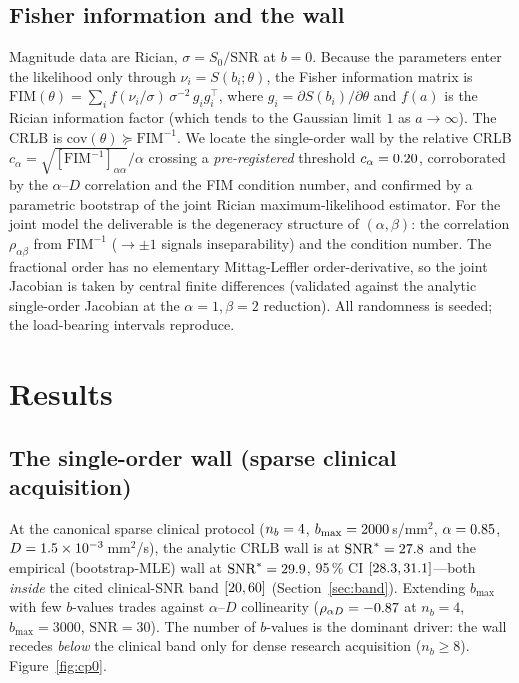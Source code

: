 \documentclass[11pt]{article}
\newcommand{\rhoab}{\rho_{\alpha\beta}}
\newcommand{\cva}{c_\alpha}
\begin{document}
\subsection{Fisher information and the wall}
Magnitude data are Rician, $\sigma=S_0/\mathrm{SNR}$ at $b=0$. Because the parameters enter the
likelihood only through $\nu_i=S(b_i;\theta)$, the Fisher information matrix is
$\mathrm{FIM}(\theta)=\sum_i f(\nu_i/\sigma)\,\sigma^{-2}\,g_i g_i^{\top}$, where
$g_i=\partial S(b_i)/\partial\theta$ and $f(a)$ is the Rician information factor (which tends to
the Gaussian limit $1$ as $a\to\infty$). The CRLB is $\mathrm{cov}(\theta)\succeq
\mathrm{FIM}^{-1}$. We locate the single-order wall by the relative CRLB
$\cva=\sqrt{[\mathrm{FIM}^{-1}]_{\alpha\alpha}}/\alpha$ crossing a \emph{pre-registered}
threshold $\cva=\numCVthr$, corroborated by the $\alpha$--$D$ correlation and the FIM condition
number, and confirmed by a parametric bootstrap of the joint Rician maximum-likelihood
estimator. For the joint model the deliverable is the degeneracy structure of $(\alpha,\beta)$:
the correlation $\rhoab$ from $\mathrm{FIM}^{-1}$ ($\to\pm1$ signals inseparability) and the
condition number. The fractional order has no elementary Mittag-Leffler order-derivative, so the
joint Jacobian is taken by central finite differences (validated against the analytic
single-order Jacobian at the $\alpha=1,\beta=2$ reduction). All randomness is seeded; the
load-bearing intervals reproduce.

\section{Results}
\label{sec:results}

\subsection{The single-order wall (sparse clinical acquisition)}
At the canonical sparse clinical protocol ($n_b=4$, $b_{\max}=2000$\,s/mm$^2$,
$\alpha=0.85$, $D=1.5\times10^{-3}$\,mm$^2$/s), the analytic CRLB wall is at
$\mathrm{SNR}^\ast=27.8$ and the empirical (bootstrap-MLE) wall at
$\mathrm{SNR}^\ast=29.9$, 95\,\% CI $[28.3,31.1]$---both \emph{inside} the
cited clinical-SNR band $[20,60]$ (Section~\ref{sec:band}). Extending $b_{\max}$
with few $b$-values trades against $\alpha$--$D$ collinearity ($\rho_{\alpha D}=-0.87$ at
$n_b=4$, $b_{\max}=3000$, $\mathrm{SNR}=30$). The number of $b$-values is the dominant driver:
the wall recedes \emph{below} the clinical band only for dense research acquisition
($n_b\ge8$). Figure~\ref{fig:cp0}.
\end{document}
